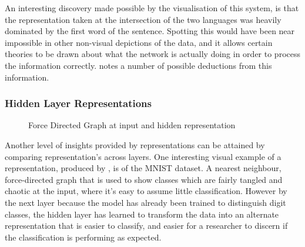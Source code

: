 \documentclass[a4paper,11pt,titlepage]{article}
\begin{document}
		
		\par 
		An interesting discovery made possible by the visualisation of this system, is that the representation taken at the intersection of the two languages was heavily dominated by the first word of the sentence. Spotting this would have been near impossible in other non-visual depictions of the data, and it allows certain theories to be drawn about what the network is actually doing in order to process the information correctly. \cite{Olah2014} notes a number of possible deductions from this information.
		
		\subsubsection{Hidden Layer Representations}
 		
 		 \begin{figure}[H]
    			\caption{Force Directed Graph at input and hidden representation}%
    			\label{fig:fdg}
		\end{figure}	
		
		Another level of insights provided by representations can be attained by comparing representation's across layers. One interesting visual example of a representation, produced by \cite{Olah2014}, is of the MNIST dataset. A nearest neighbour, force-directed graph that is used to show classes which are fairly tangled and chaotic at the input, where it's easy to assume little classification. However by the next layer because the model has already been trained to distinguish digit classes, the hidden layer has learned to transform the data into an alternate representation that is easier to classify, and easier for a researcher to discern if the classification is performing as expected.				
		\par 
	
\end{document}
